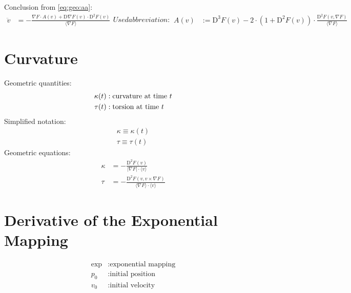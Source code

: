 \documentclass{scrartcl}
\newcommand{ \skaq }[ 1 ]{ \langle #1 \rangle }
\newcommand{ \abs }[ 1 ]{ \lvert #1 \rvert }
\newcommand{ \mult }{ \cdot }
\newcommand{ \diff }[ 2 ]{ \mathrm{D}^{ #1 }#2 }
\newcommand{ \grad }[ 1 ]{ \nabla#1 }
\begin{document}
Conclusion from \eqref{eq:geo:aa}:
\begin{subequations}
\begin{align}
\ddot{ v }   &=
- \frac{ \grad F \mult A( v )  +
\diff{}{ \grad{ F } }( v ) \mult \diff{ 2 }{ F }( v ) }{ \skaq{ \grad{ F } } }
\end{align}
Used abbreviation:
\begin{align}
A( v )  &:=
\diff{ 3 }{ F }( v ) -
2 \mult \left( 1 + \diff{ 2 }{ F }( v ) \right) \mult
\frac{ \diff{ 2 }{ F }( v, \grad{ F } ) }{ \skaq{ \grad{ F } } }
\end{align}
\end{subequations}


\newpage
\section{Curvature}


Geometric quantities:
\begin{subequations}
\begin{align}
\kappa( t )  &:  \text{curvature at time $ t $}\\
\tau( t )    &:  \text{torsion at time $ t $}
\end{align}
\end{subequations}
Simplified notation:
\begin{subequations}
\begin{align}
\kappa  \equiv  \kappa( t )\\
\tau    \equiv  \tau( t )
\end{align}
\end{subequations}
Geometric equations:
\begin{subequations}
\begin{align}
\kappa   &=   -\frac{ \diff{ 2 }{ F }( v ) }{ \abs{ \grad{ F } } \mult \skaq{ v } }\\
\tau     &=   -\frac{ \diff{ 2 }{ F }( v, v \times \grad{ F } ) }{ \skaq{ \grad{ F } } \mult \skaq{ v } }
\end{align}
\end{subequations}


\newpage
\section{Derivative of the Exponential Mapping}


\begin{subequations}
\begin{align}
\exp  &:  \text{exponential mapping}\\
p_0  &:  \text{initial position}\\
v_0  &:  \text{initial velocity}
\end{align}
\end{subequations}
\end{document}
